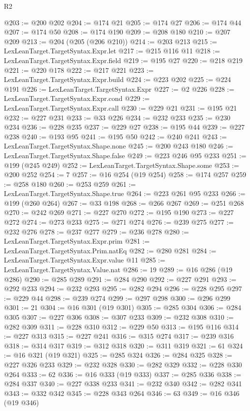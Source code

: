 \begin{lexlean}{R2}
\begin{coremodule}
@203 := @200 @202
@204 := @174 @21
@205 := @174 @27
@206 := @174 @44
@207 := @174 @50
@208 := @174 @190
@209 := @208 @180
@210 := @207 @209
@213 := @204 (@205 (@206 @210))
@214 := @203 @213
@215 := LexLeanTarget.TargetSyntax.Expr.let
@217 := @215 @116 @11
@218 := LexLeanTarget.TargetSyntax.Expr.field
@219 := @195 @27
@220 := @218 @219
@221 := @220 @178
@222 := @217 @221
@223 := LexLeanTarget.TargetSyntax.Expr.build
@224 := @223 @202
@225 := @224 @191
@226 := LexLeanTarget.TargetSyntax.Expr
@227 := @2 @226
@228 := LexLeanTarget.TargetSyntax.Expr.cond
@229 := LexLeanTarget.TargetSyntax.Expr.call
@230 := @229 @21
@231 := @195 @21
@232 := @227 @231
@233 := @33 @226
@234 := @232 @233
@235 := @230 @234
@236 := @228 @235
@237 := @229 @27
@238 := @195 @44
@239 := @227 @238
@240 := @193 @95
@241 := @195 @50
@242 := @240 @241
@243 := LexLeanTarget.TargetSyntax.Shape.none
@245 := @200 @243 @180
@246 := LexLeanTarget.TargetSyntax.Shape.false
@249 := @223 @246 @95 @233
@251 := @199 (@245 @249)
@252 := LexLeanTarget.TargetSyntax.Shape.some
@253 := @200 @252
@254 := 7
@257 := @16 @254 (@19 @254)
@258 := @174 @257
@259 := @258 @180
@260 := @253 @259
@261 := LexLeanTarget.TargetSyntax.Shape.true
@264 := @223 @261 @95 @233
@266 := @199 (@260 @264)
@267 := @33 @198
@268 := @266 @267
@269 := @251 @268
@270 := @242 @269
@271 := @227 @270
@272 := @195 @190
@273 := @227 @272
@274 := @273 @233
@275 := @271 @274
@276 := @239 @275
@277 := @232 @276
@278 := @237 @277
@279 := @236 @278
@280 := LexLeanTarget.TargetSyntax.Expr.prim
@281 := LexLeanTarget.TargetSyntax.Prim.natEq
@282 := @280 @281
@284 := LexLeanTarget.TargetSyntax.Expr.value @11
@285 := LexLeanTarget.TargetSyntax.Value.nat
@286 := 19
@289 := @16 @286 (@19 @286)
@290 := @285 @289
@291 := @284 @290
@292 := @227 @291
@293 := @292 @233
@294 := @232 @293
@295 := @282 @294
@296 := @228 @295
@297 := @229 @44
@298 := @239 @274
@299 := @297 @298
@300 := @296 @299
@301 := 21
@304 := @16 @301 (@19 @301)
@305 := @285 @304
@306 := @284 @305
@307 := @227 @306
@308 := @307 @233
@309 := @232 @308
@310 := @282 @309
@311 := @228 @310
@312 := @229 @50
@313 := @195 @116
@314 := @227 @313
@315 := @227 @241
@316 := @315 @274
@317 := @239 @316
@318 := @314 @317
@319 := @312 @318
@320 := @311 @319
@321 := 61
@324 := @16 @321 (@19 @321)
@325 := @285 @324
@326 := @284 @325
@328 := @227 @326 @233
@329 := @232 @328
@330 := @282 @329
@332 := @228 @330 @264
@333 := 62
@336 := @16 @333 (@19 @333)
@337 := @285 @336
@338 := @284 @337
@340 := @227 @338 @233
@341 := @232 @340
@342 := @282 @341
@343 := @332 @342
@345 := @228 @343 @264
@346 := 63
@349 := @16 @346 (@19 @346)

\end{coremodule}
\end{lexlean}
